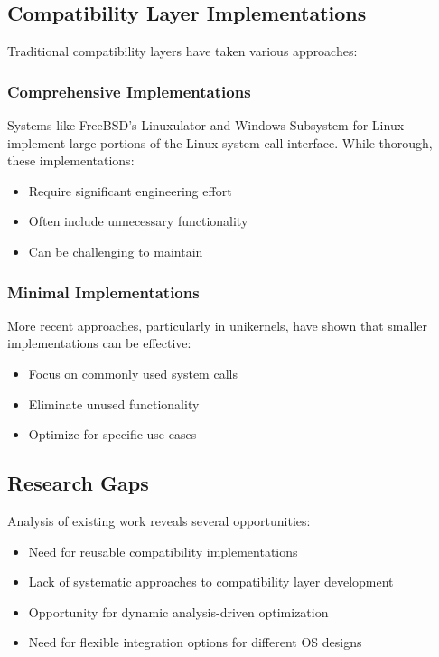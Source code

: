 \documentclass[conference]{IEEEtran}
\begin{document}
\subsection{Compatibility Layer Implementations}
Traditional compatibility layers have taken various approaches:

\subsubsection{Comprehensive Implementations}
Systems like FreeBSD's Linuxulator and Windows Subsystem for Linux implement large portions of the Linux system call interface. While thorough, these implementations:
\begin{itemize}
	\item Require significant engineering effort
	\item Often include unnecessary functionality
	\item Can be challenging to maintain
\end{itemize}

\subsubsection{Minimal Implementations}
More recent approaches, particularly in unikernels, have shown that smaller implementations can be effective:
\begin{itemize}
	\item Focus on commonly used system calls
	\item Eliminate unused functionality
	\item Optimize for specific use cases
\end{itemize}

\subsection{Research Gaps}
Analysis of existing work reveals several opportunities:
\begin{itemize}
	\item Need for reusable compatibility implementations
	\item Lack of systematic approaches to compatibility layer development
	\item Opportunity for dynamic analysis-driven optimization
	\item Need for flexible integration options for different OS designs
\end{itemize}
\end{document}
